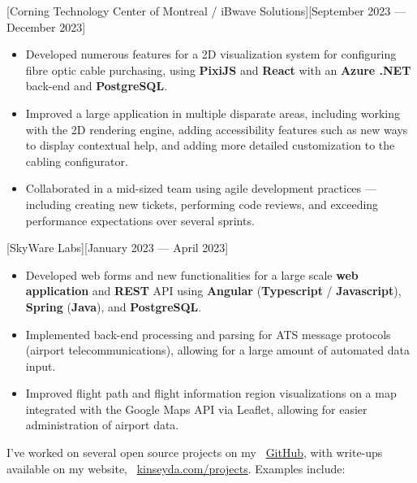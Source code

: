 \documentclass{article}
\begin{document}
\vspace*{\fill}


[Corning Technology Center of Montreal /
	iBwave Solutions][September 2023 --- December 2023]

\begin{itemize}
	\item Developed numerous features for a 2D visualization system for
	      configuring fibre optic cable purchasing, using \textbf{PixiJS} and
	      \textbf{React} with an \textbf{Azure .NET} back-end and
	      \textbf{PostgreSQL}.
	\item Improved a large application in multiple disparate areas, including
	      working with the 2D rendering engine, adding accessibility features
	      such as new ways to display contextual help, and adding more detailed
	      customization to the cabling configurator.
	\item Collaborated in a mid-sized team using agile development practices ---
	      including creating new tickets, performing code reviews, and exceeding
	      performance expectations over several sprints.
\end{itemize}

[SkyWare Labs][January 2023 --- April 2023]

\begin{itemize}
	\item Developed web forms and new functionalities for a large scale
	      \textbf{web application} and \textbf{REST} API using
	      \textbf{Angular} (\textbf{Typescript} / \textbf{Javascript}),
	      \textbf{Spring} (\textbf{Java}), and \textbf{PostgreSQL}.
	\item Implemented back-end processing and parsing for ATS message protocols
	      (airport telecommunications), allowing for a large amount of automated
	      data input.
	\item Improved flight path and flight information region visualizations on a
	      map integrated with the Google Maps API via Leaflet, allowing for
	      easier administration of airport data.
\end{itemize}

\vspace*{\fill}


I've worked on several open source projects on my \faGithub\
\href{https://github.com/kinseyda}{GitHub}, with write-ups available on my
website, \faGlobe\ \href{https://kinseyda.com/projects}{kinseyda.com/projects}.
Examples include:
\end{document}
